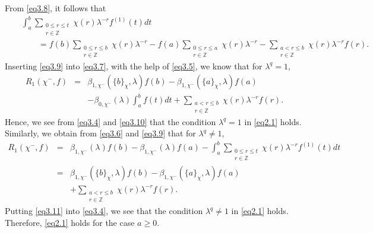 \documentclass[reqno]{amsart}
\numberwithin{equation}{section}
\begin{document}
From \eqref{eq3.8}, it follows that
\begin{eqnarray}\label{eq3.9}
&&\int_{a}^{b}\underset{\substack{0\leqslant r\leqslant t\\ r\in\mathbb{Z}}}{\sum}\chi(r)\lambda^{-r}f^{(1)}(t)dt\nonumber\\
&&\qquad=f(b)\underset{\substack{0\leqslant r\leqslant b\\ r\in\mathbb{Z}}}{\sum}\chi(r)\lambda^{-r}-f(a)\underset{\substack{0\leqslant r\leqslant a\\ r\in\mathbb{Z}}}{\sum}\chi(r)\lambda^{-r}-\underset{\substack{a<r\leqslant b\\ r\in\mathbb{Z}}}{\sum}\chi(r)\lambda^{-r}f(r).
\end{eqnarray}
Inserting \eqref{eq3.9} into \eqref{eq3.7}, with the help of \eqref{eq3.5}, we know that for $\lambda^{q}=1$,
\begin{eqnarray}\label{eq3.10}
R_{1}(\chi^{-},f)&=&\beta_{1,\chi^{-}}(\{b\}_{\chi},\lambda)f(b)-\beta_{1,\chi^{-}}(\{a\}_{\chi},\lambda)f(a)\nonumber\\
&&-\beta_{0,\chi^{-}}(\lambda)\int_{a}^{b}f(t)dt+\underset{\substack{a< r\leqslant b\\ r\in\mathbb{Z}}}{\sum}\chi(r)\lambda^{-r}f(r).
\end{eqnarray}
Hence, we see from \eqref{eq3.4} and \eqref{eq3.10} that the condition $\lambda^{q}=1$ in \eqref{eq2.1} holds. Similarly, we obtain from \eqref{eq3.6} and \eqref{eq3.9} that for $\lambda^{q}\neq1$,
\begin{eqnarray}\label{eq3.11}
R_{1}(\chi^{-},f)
&=&\beta_{1,\chi^{-}}(\lambda)f(b)-\beta_{1,\chi^{-}}(\lambda)f(a)-\int_{a}^{b}\underset{\substack{0\leqslant r\leqslant t\\ r\in\mathbb{Z}}}{\sum}\chi(r)\lambda^{-r}f^{(1)}(t)dt\nonumber\\
&=&\beta_{1,\chi^{-}}(\{b\}_{\chi},\lambda)f(b)-\beta_{1,\chi^{-}}(\{a\}_{\chi},\lambda)f(a)\nonumber\\
&&+\underset{\substack{a< r\leqslant b\\ r\in\mathbb{Z}}}{\sum}\chi(r)\lambda^{-r}f(r).
\end{eqnarray}
Putting \eqref{eq3.11} into \eqref{eq3.4}, we see that the condition $\lambda^{q}\neq1$ in \eqref{eq2.1} holds. Therefore, \eqref{eq2.1} holds for the case $a\geqslant0$.
\end{document}
